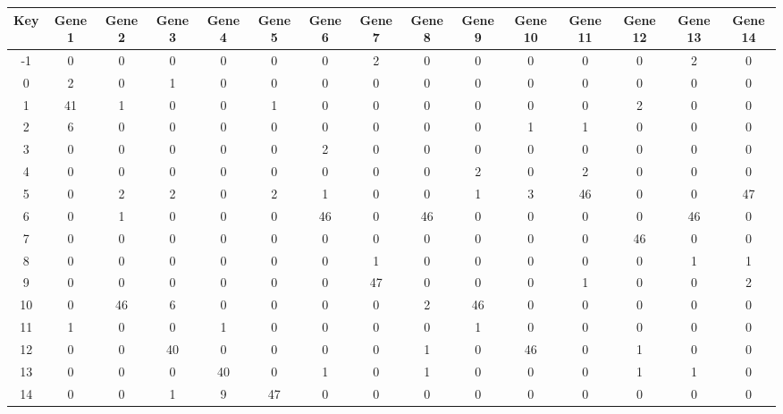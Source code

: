 \begin{tabular}{|c|c|c|c|c|c|c|c|c|c|c|c|c|c|c|}
\hline
Key & Gene 1 & Gene 2 & Gene 3 & Gene 4 & Gene 5 & Gene 6 & Gene 7 & Gene 8 & Gene 9 & Gene 10 & Gene 11 & Gene 12 & Gene 13 & Gene 14 \\
\hline
-1 & 0 & 0 & 0 & 0 & 0 & 0 & 2 & 0 & 0 & 0 & 0 & 0 & 2 & 0 \\
0 & 2 & 0 & 1 & 0 & 0 & 0 & 0 & 0 & 0 & 0 & 0 & 0 & 0 & 0 \\
1 & 41 & 1 & 0 & 0 & 1 & 0 & 0 & 0 & 0 & 0 & 0 & 2 & 0 & 0 \\
2 & 6 & 0 & 0 & 0 & 0 & 0 & 0 & 0 & 0 & 1 & 1 & 0 & 0 & 0 \\
3 & 0 & 0 & 0 & 0 & 0 & 2 & 0 & 0 & 0 & 0 & 0 & 0 & 0 & 0 \\
4 & 0 & 0 & 0 & 0 & 0 & 0 & 0 & 0 & 2 & 0 & 2 & 0 & 0 & 0 \\
5 & 0 & 2 & 2 & 0 & 2 & 1 & 0 & 0 & 1 & 3 & 46 & 0 & 0 & 47 \\
6 & 0 & 1 & 0 & 0 & 0 & 46 & 0 & 46 & 0 & 0 & 0 & 0 & 46 & 0 \\
7 & 0 & 0 & 0 & 0 & 0 & 0 & 0 & 0 & 0 & 0 & 0 & 46 & 0 & 0 \\
8 & 0 & 0 & 0 & 0 & 0 & 0 & 1 & 0 & 0 & 0 & 0 & 0 & 1 & 1 \\
9 & 0 & 0 & 0 & 0 & 0 & 0 & 47 & 0 & 0 & 0 & 1 & 0 & 0 & 2 \\
10 & 0 & 46 & 6 & 0 & 0 & 0 & 0 & 2 & 46 & 0 & 0 & 0 & 0 & 0 \\
11 & 1 & 0 & 0 & 1 & 0 & 0 & 0 & 0 & 1 & 0 & 0 & 0 & 0 & 0 \\
12 & 0 & 0 & 40 & 0 & 0 & 0 & 0 & 1 & 0 & 46 & 0 & 1 & 0 & 0 \\
13 & 0 & 0 & 0 & 40 & 0 & 1 & 0 & 1 & 0 & 0 & 0 & 1 & 1 & 0 \\
14 & 0 & 0 & 1 & 9 & 47 & 0 & 0 & 0 & 0 & 0 & 0 & 0 & 0 & 0 \\
\hline
\end{tabular}